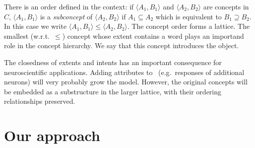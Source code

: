 \documentclass[11pt,a4paper]{article}
\begin{document}
There is an order defined in the context:
if $\langle A_1 , B_1 \rangle$ and $\langle A_2 , B_2 \rangle$ are concepts in
$C$, $\langle A_1 , B_1 \rangle$ is a \emph{subconcept} of $\langle A_2 , B_2
\rangle$ if $A_1 \subseteq A_2 $ which is equivalent to $B_1 \supseteq B_2 $.  In this case
we write $\langle A_1 , B_1 \rangle \le \langle A_2 , B_2 \rangle$.
The concept order forms a %
lattice.
The smallest (w.r.t.~$\le$) concept whose extent contains a word plays an
importand role in the concept hierarchy.  We say that this concept
introduces the object.

The closedness of extents and intents has an important consequence for
neuroscientific applications. Adding attributes to \at~(e.g.~responses of
additional neurons) will very probably grow the model.  However, the original
concepts will be embedded as a substructure in the larger lattice, with their
ordering relationships preserved.

\section{Our approach}
\end{document}
